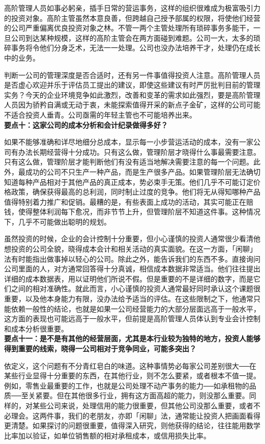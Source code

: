 \documentclass[UTF8,a4paper,zihao=-4,fontset = windows]{ctexart} %
\begin{document}
高阶管理人员如事必躬亲，插手日常的营运事务，这样的组织很难成为极富吸引力的投资对象。高阶主管虽然本意良善，但跨越自己授予部属的权限，将使他们经营的公司严重偏离优良投资对象之林。不管一两个主管处理所有琐碎事务多能干，一旦公司到达某种规模，这样的高阶主管会在两方面碰到难题。公司一大，太多的琐碎事务将令他们分身乏术，无法一一处理。公司也没办法培养干才，处理仍在成长中的业务。

判断一公司的管理深度是否合适时，还有另一件事值得投资人注意。高阶管理人员是否虚心欢迎并乐于评估员工提出的建议，即使这些建议有时严厉批判目前的管理实务？今天的企业环境竞争如此激烈，改善和变革的需求如此强烈，要是高阶管理人员因为骄矜自满或无动于衷，未能探索值得开采的新点子金矿，这样的公司可能不适合投资人垂青。公司亟需的年轻主管也不可能培养出来。
\\

\textbf{要点十：这家公司的成本分析和会计纪录做得多好？}


如果不能够准确和详尽地细分总成本，显示每一小步营运活动的成本，没有一家公司有办法长期经营得十分成功。只有这么做，管理阶层才晓得什么事最需要注意。只有这么做，管理阶层才能判断他们有没有适当地解决需要注意的每一个问题。此外，最成功的公司不只生产一种产品，而是生产很多产品。如果管理阶层无法确切知道每种产品相对于其他产品的真正成本，势必束手无策。他们几乎不可能订定价格政策，确保获得最高的总利润，同时制止过度的竞争。他们将无从得知哪种产品值得特别着力推广和促销。最糟的是，有些表面上成功的活动，其实可能正在赔钱，使得整体利润每下愈况，而非节节上升，但管理阶层不知道这件事。这种情况下，几乎不可能做出聪明的规划。

虽然投资的时候，企业的会计控制十分重要，但小心谨慎的投资人通常很少看清他想投资的公司全貌，晓得成本会计和相关活动的真实面貌。在这一方面，「闲聊」法有时能指出做事掉以轻心的公司。除此之外，能告诉我们的东西不多。直接询问公司里面的人，对方通常回答得十分真诚，相信成本数据非常适当。他们往往提出详细的成本数据表，用以证明他们所说不假。但是重要的不是详细的数字，而是它们之间的相对准确性。就此而言，小心谨慎的投资人通常最好同时承认这个课题很重要，以及他本身能力有限，没办法给予适当的评估。在这些限制之下，他通常只能依赖一般性的结论，也就是如果一公司经营能力的大部分层面远高于一般水平，这方面的表现也可能远高于一般水平，但前提是高阶管理人员体认到专业会计控制和成本分析很重要。
\\

\textbf{要点十一：是不是有其他的经营层面，尤其是本行业较为独特的地方，投资人能够得到重要的线索，晓得一公司相对于竞争同业，可能多突出？}


依定义，这个问题有不分青红皂白的味道。这种事情势必每家公司差别很大──在某些行业显得十分重要的东西，在其他行业，则不怎么要紧，或者根本不值一提。例如，零售业最重要的工作，也就是公司处理不动产事务的能力──如承租物的品质──至关紧要。但在其他很多行业，拥有这方面高超的能力，则没那么重要。同样的，对某些公司来说，处理信用的能力很重要，但其他公司没那么重要，或者不必理会。这两件事，我们的老朋友，亦即「闲聊」法，通常能让投资人把画面看得更清楚。如果探讨的问题很重要，值得深入研究，则他获得的结论，往往能用数学比率加以验证，如单位销售额的相对承租成本，或信用损失比率。
\end{document}
